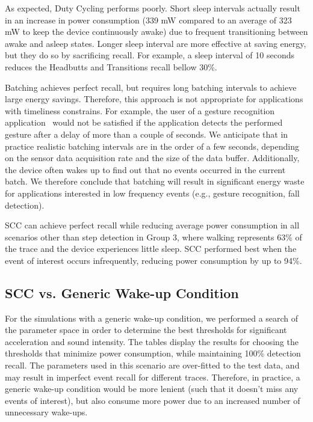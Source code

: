 As expected, Duty Cycling performs poorly.  Short sleep intervals
actually result in an increase in power consumption (339 mW compared to an
average of 323 mW to keep the device continuously awake) due to frequent
transitioning between awake and asleep states.  Longer sleep interval
are more effective at saving energy, but they do so by sacrificing
recall.  For example, a sleep interval of 10 seconds reduces the
Headbutts and Transitions recall bellow 30\%.

Batching achieves perfect recall, but requires long
batching intervals to achieve large energy savings.  Therefore, this
approach is not appropriate for applications with timeliness
constrains.  For example, the user of a gesture recognition
application~\cite{liu2009uwave,schlomer2008gesture} would not be
satisfied if the application detects the performed gesture after a
delay of more than a couple of seconds.  We anticipate that in
practice realistic batching intervals are in the order of a few
seconds, depending on the sensor data acquisition rate and the size
of the data buffer.  Additionally, the device often wakes up to find 
out that no 
events occurred in the current batch. We therefore conclude that 
batching will result in significant energy waste for applications 
interested in low frequency events (e.g., gesture recognition, fall 
detection).

SCC can achieve perfect recall while reducing average power consumption
in all scenarios other than step detection
in Group 3, where walking represents 63\% of the trace and the device
experiences little sleep.  SCC performed best when the event
of interest occurs infrequently, reducing power consumption by up to
94\%.  


\subsection{SCC vs. Generic Wake-up Condition}

For the simulations with a generic wake-up condition, we performed a search
of the parameter space in order to determine the best thresholds for 
significant acceleration and sound 
intensity.  The tables display the results for choosing the thresholds that
minimize power consumption, while maintaining 100\% detection recall.
The parameters used in this scenario are over-fitted to the test data, and 
may result in imperfect event recall for different traces.  Therefore, 
in practice, a generic wake-up condition would be more 
lenient (such that it doesn't miss any events of interest), but also consume
more power due to an increased number of unnecessary wake-ups.

